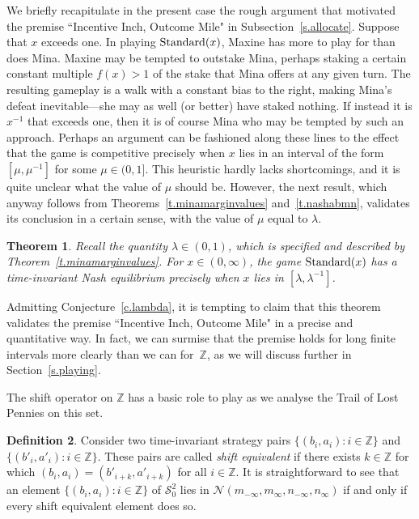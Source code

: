 \documentclass[letterpaper,11pt,oneside,reqno]{amsbook}
\newcommand{\Z}{\ensuremath{\mathbb{Z}}}
\newtheorem{theorem}{Theorem}[chapter]
\numberwithin{figure}{chapter}
\theoremstyle{definition}
\theoremstyle{definition}
\theoremstyle{definition}
\newtheorem{definition}[theorem]{Definition}
\theoremstyle{definition}
\theoremstyle{definition}
\newcommand{\mc}{\mathcal}
\newcommand{\standard}{{\rm Standard}}
\begin{document}
 We briefly recapitulate in the present case the rough argument that motivated the premise ``Incentive Inch, Outcome Mile" in Subsection~\ref{s.allocate}. Suppose that $x$ exceeds one. In playing $\standard(x)$, Maxine has more to play for than does Mina. Maxine may be tempted to outstake Mina, perhaps staking a certain constant multiple $f(x) >1$
 of the stake that Mina offers at any given turn. The resulting gameplay is a walk with a constant bias to the right, making Mina's defeat inevitable---she may as well (or better) have staked nothing. If instead it is $x^{-1}$ that exceeds one, then it is of course Mina who may be tempted by such an approach. Perhaps an argument can be fashioned along these lines to the effect that the game is competitive precisely when $x$ lies in an interval of the form $[\mu,\mu^{-1}]$ for some $\mu \in (0,1]$. This heuristic hardly lacks shortcomings, and it is quite unclear what the value of $\mu$ should be. However, the next result, which anyway follows from Theorems~\ref{t.minamarginvalues} and~\ref{t.nashabmn}, validates its conclusion in a certain sense, with the value of $\mu$ equal to $\lambda$.
\begin{theorem}\label{t.nashequil.prelim}
Recall the quantity $\lambda \in (0,1)$, which is specified and described by Theorem~\ref{t.minamarginvalues}.
For $x \in (0,\infty)$, the  game $\standard(x)$ has a time-invariant Nash equilibrium 
precisely when $x$ lies in $[\lambda,\lambda^{-1}]$.
\end{theorem}
Admitting Conjecture~\ref{c.lambda}, it is tempting to claim that this theorem validates the premise ``Incentive Inch, Outcome Mile" in a precise and quantitative way. In fact, we can surmise that the premise holds for long finite intervals more clearly than we can for~$\Z$, as we will discuss further in Section~\ref{s.playing}.

The shift operator on $\Z$ has a basic role to play as we analyse the Trail of Lost Pennies on this set.
\begin{definition}\label{d.shiftone}
Consider two time-invariant strategy pairs $\big\{ (b_i,a_i): i \in \Z \big\}$ and  $\big\{ (b'_i,a'_i): i \in \Z \big\}$. These pairs are called {\em shift equivalent} if there exists $k \in \Z$
for which   $(b_i,a_i) = (b'_{i+k},a'_{i+k})$ for all $i \in \Z$.
It is straightforward to see that an element  $\big\{ (b_i,a_i): i \in \Z \big\}$ of $\mc{S}_0^2$
lies in $\mc{N}(m_{-\infty},m_\infty,n_{-\infty},n_\infty)$ if and only if every shift equivalent element does so.
\end{definition}
\end{document}
